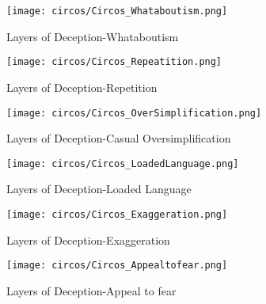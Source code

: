 \begin{figure*}[htbp]
    \begin{subfigure}[b]{0.50\textwidth}
    \centering
        \texttt{[image: circos/Circos\_Whataboutism.png]}
        \caption{Layers of Deception-Whataboutism}
    \end{subfigure}
    \begin{subfigure}[b]{0.50\textwidth}
    \centering
        \texttt{[image: circos/Circos\_Repeatition.png]}
        \caption{Layers of Deception-Repetition}
    \end{subfigure}
    \begin{subfigure}[b]{0.50\textwidth}
    \centering
        \texttt{[image: circos/Circos\_OverSimplification.png]}
        \caption{Layers of Deception-Casual Oversimplification}
    \end{subfigure}
    \begin{subfigure}[b]{0.50\textwidth}
    \centering
        \texttt{[image: circos/Circos\_LoadedLanguage.png]}
        \caption{Layers of Deception-Loaded Language}
    \end{subfigure}
    \begin{subfigure}[b]{0.50\textwidth}
    \centering
        \texttt{[image: circos/Circos\_Exaggeration.png]}
        \caption{Layers of Deception-Exaggeration}
    \end{subfigure}
    \begin{subfigure}[b]{0.50\textwidth}
    \centering
        \texttt{[image: circos/Circos\_Appealtofear.png]}
        \caption{Layers of Deception-Appeal to fear}
    \end{subfigure}
\end{figure*}
